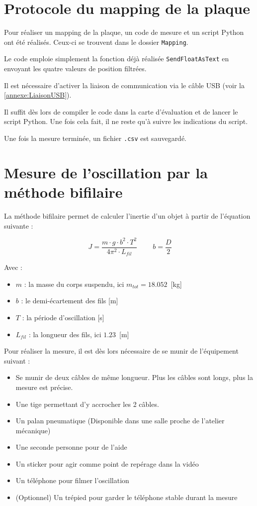 \section{Protocole du mapping de la plaque}
\label{annexe:Mapping}
Pour réaliser un mapping de la plaque, un code de mesure et un script Python ont été réalisés. Ceux-ci se trouvent dans le dossier \texttt{Mapping}.

Le code emploie simplement la fonction déjà réalisée \texttt{SendFloatAsText} en envoyant les quatre valeurs de position filtrées.

Il est nécessaire d'activer la liaison de communication via le câble USB (voir la \autoref{annexe:LiaisonUSB}).

Il suffit dès lors de compiler le code dans la carte d'évaluation et de lancer le script Python. Une fois cela fait, il ne reste qu'à suivre les indications du script.

Une fois la mesure terminée, un fichier \texttt{.csv} est sauvegardé.

\section{Mesure de l'oscillation par la méthode bifilaire}
\label{annexe:MesBifilaire}
La méthode bifilaire permet de calculer l'inertie d'un objet à partir de l'équation suivante :

\begin{equation}
  \boxed{\ J = \frac{m \cdot g \cdot b^2 \cdot T^2}{4\pi^2 \cdot L_{fil}}\ } \qquad b = \frac{D}{2}
  \label{eq:bifilaireManuel}
\end{equation}

Avec :

\begin{itemize}
  \item $m$ : la masse du corps suspendu, ici $m_{tot} = 18.052$~[kg]
  \item $b$ : le demi-écartement des fils [m]
  \item $T$ : la période d'oscillation [s]
  \item $L_{fil}$ : la longueur des fils, ici $1.23$~[m]
\end{itemize}

Pour réaliser la mesure, il est dès lors nécessaire de se munir de l'équipement suivant :

\begin{itemize}
  \item Se munir de deux câbles de même longueur. Plus les câbles sont longs, plus la mesure est précise.
  \item Une tige permettant d'y accrocher les 2 câbles.
  \item Un palan pneumatique (Disponible dans une salle proche de l'atelier mécanique)
  \item Une seconde personne pour de l'aide
  \item Un sticker pour agir comme point de repérage dans la vidéo
  \item Un téléphone pour filmer l'oscillation
  \item (Optionnel) Un trépied pour garder le téléphone stable durant la mesure
\end{itemize}

